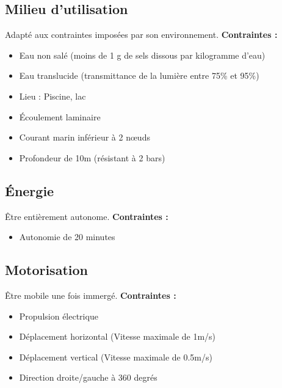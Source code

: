 \documentclass[a4paper,11pt]{report}
\begin{document}
						\subsection{Milieu d'utilisation}
								Adapté aux contraintes imposées par son environnement. \newline
								\textbf{Contraintes :}
								\begin{itemize}
										\item Eau non salé (moins de 1 g de sels dissous par kilogramme d'eau)
										\item Eau translucide (transmittance de la lumière entre 75\% et 95\%)
										\item Lieu : Piscine, lac
										\item Écoulement laminaire
										\item Courant marin inférieur à 2 nœuds
										\item Profondeur de 10m (résistant à 2 bars) \newline \newline
								\end{itemize}

						\subsection{Énergie}
								Être entièrement autonome. \newline
								\textbf{Contraintes :}
								\begin{itemize}
										\item Autonomie de 20 minutes
								\end{itemize}

						\subsection{Motorisation}
								Être mobile une fois immergé. \newline
								\textbf{Contraintes :}
								\begin{itemize}
										\item Propulsion électrique
										\item Déplacement horizontal (Vitesse maximale de 1m/s)
										\item Déplacement vertical (Vitesse maximale de 0.5m/s)
										\item Direction droite/gauche à 360 degrés   \newline \newline
								\end{itemize}
\end{document}
